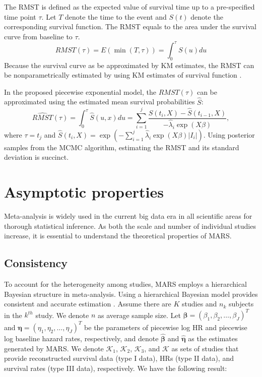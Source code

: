 \documentclass[12pt]{article}
\theoremstyle{mystyle}
\begin{document}
The RMST is defined as the expected value of survival time up to a pre-specified time point $\tau$. Let $T$ denote the time to the event and $S(t)$ denote the corresponding survival function. The RMST equals to the area under the survival curve from baseline to $\tau$. 
\begin{equation*}
RMST(\tau) = E(\min(T,\tau)) = \int_{0}^{\tau} S(u)du
\end{equation*} 
Because the survival curve as be approximated by KM estimates, the RMST can be nonparametrically estimated by using KM estimates of survival function \citep{Guo2019AnalyzingRM}.

In the proposed piecewise exponential model, the $RMST(\tau)$ can be approximated using the estimated mean survival probabilities $\hat{S}$:
\begin{equation*}
\widehat{RMST}(\tau) = \int_{0}^{\tau} \hat{S}(u,x)du =\sum_{i=1}^{j} \frac{\hat{S}(t_{i},X)-\hat{S}(t_{i-1},X)}{-\hat{\lambda}_{i}\exp{(X\beta)}},
\end{equation*}
where $\tau=t_{j}$ and $\hat{S}(t_i,X)=\exp(-\sum_{i=1}^j\hat{\lambda}_i\exp{(X\beta)}|I_i|)$. Using posterior samples from the MCMC algorithm, estimating the RMST and its standard deviation is succinct.  





\section{Asymptotic properties}
\label{sec:5} 

Meta-analysis is widely used in the current big data era in all scientific areas for thorough statistical inference. As both the scale and number of individual studies increase, it is essential to understand the theoretical properties of MARS.

\subsection{Consistency}

To account for the heterogeneity among studies, MARS employs a hierarchical Bayesian structure in meta-analysis. Using a hierarchical Bayesian model provides consistent and accurate estimation \citep{rouder2005introduction}. Assume there are $K$ studies and $n_k$ subjects in the $k^{th}$ study. We denote $n$ as average sample size. Let ${\boldsymbol\beta}=(\beta_1,\beta_2,\dots,\beta_J)^T$ and ${\boldsymbol\eta}=(\eta_1,\eta_2,\dots,\eta_J)^T$ be the parameters of piecewise log HR and piecewise log baseline hazard rates, respectively, and denote $\hat{\boldsymbol\beta}$ and $\hat{\boldsymbol\eta}$ as the estimates generated by MARS. We denote $\mathcal{K}_1$, $\mathcal{K}_2$, $\mathcal{K}_3$, and $\mathcal{K}$ as sets of studies that provide reconstructed survival data (type I data), HRs (type II data), and survival rates (type III data), respectively. We have the following result:
\end{document}
